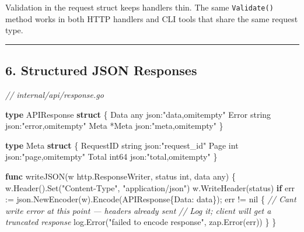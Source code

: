 \documentclass[
]{article}
\newenvironment{Shaded}{}{}
\newcommand{\CommentTok}[1]{\textcolor[rgb]{0.38,0.63,0.69}{\textit{#1}}}
\newcommand{\ControlFlowTok}[1]{\textcolor[rgb]{0.00,0.44,0.13}{\textbf{#1}}}
\newcommand{\DataTypeTok}[1]{\textcolor[rgb]{0.56,0.13,0.00}{#1}}
\newcommand{\KeywordTok}[1]{\textcolor[rgb]{0.00,0.44,0.13}{\textbf{#1}}}
\newcommand{\NormalTok}[1]{#1}
\newcommand{\OperatorTok}[1]{\textcolor[rgb]{0.40,0.40,0.40}{#1}}
\newcommand{\OtherTok}[1]{\textcolor[rgb]{0.00,0.44,0.13}{#1}}
\newcommand{\StringTok}[1]{\textcolor[rgb]{0.25,0.44,0.63}{#1}}
\begin{document}
Validation in the request struct keeps handlers thin. The same
\texttt{Validate()} method works in both HTTP handlers and CLI tools
that share the same request type.

\begin{center}\rule{0.5\linewidth}{0.5pt}\end{center}

\hypertarget{structured-json-responses}{%
\subsection{6. Structured JSON
Responses}\label{structured-json-responses}}

\begin{Shaded}
\begin{Highlighting}[]
\CommentTok{// internal/api/response.go}

\KeywordTok{type}\NormalTok{ APIResponse }\KeywordTok{struct} \OperatorTok{\{}
\NormalTok{    Data  any    }\StringTok{\textasciigrave{}json:"data,omitempty"\textasciigrave{}}
\NormalTok{    Error }\DataTypeTok{string} \StringTok{\textasciigrave{}json:"error,omitempty"\textasciigrave{}}
\NormalTok{    Meta  }\OperatorTok{*}\NormalTok{Meta  }\StringTok{\textasciigrave{}json:"meta,omitempty"\textasciigrave{}}
\OperatorTok{\}}

\KeywordTok{type}\NormalTok{ Meta }\KeywordTok{struct} \OperatorTok{\{}
\NormalTok{    RequestID }\DataTypeTok{string} \StringTok{\textasciigrave{}json:"request\_id"\textasciigrave{}}
\NormalTok{    Page      }\DataTypeTok{int}    \StringTok{\textasciigrave{}json:"page,omitempty"\textasciigrave{}}
\NormalTok{    Total     }\DataTypeTok{int64}  \StringTok{\textasciigrave{}json:"total,omitempty"\textasciigrave{}}
\OperatorTok{\}}

\KeywordTok{func}\NormalTok{ writeJSON}\OperatorTok{(}\NormalTok{w http}\OperatorTok{.}\NormalTok{ResponseWriter}\OperatorTok{,}\NormalTok{ status }\DataTypeTok{int}\OperatorTok{,}\NormalTok{ data any}\OperatorTok{)} \OperatorTok{\{}
\NormalTok{    w}\OperatorTok{.}\NormalTok{Header}\OperatorTok{().}\NormalTok{Set}\OperatorTok{(}\StringTok{"Content{-}Type"}\OperatorTok{,} \StringTok{"application/json"}\OperatorTok{)}
\NormalTok{    w}\OperatorTok{.}\NormalTok{WriteHeader}\OperatorTok{(}\NormalTok{status}\OperatorTok{)}
    \ControlFlowTok{if}\NormalTok{ err }\OperatorTok{:=}\NormalTok{ json}\OperatorTok{.}\NormalTok{NewEncoder}\OperatorTok{(}\NormalTok{w}\OperatorTok{).}\NormalTok{Encode}\OperatorTok{(}\NormalTok{APIResponse}\OperatorTok{\{}\NormalTok{Data}\OperatorTok{:}\NormalTok{ data}\OperatorTok{\});}\NormalTok{ err }\OperatorTok{!=} \OtherTok{nil} \OperatorTok{\{}
        \CommentTok{// Can\textquotesingle{}t write error at this point — headers already sent}
        \CommentTok{// Log it; client will get a truncated response}
\NormalTok{        log}\OperatorTok{.}\NormalTok{Error}\OperatorTok{(}\StringTok{"failed to encode response"}\OperatorTok{,}\NormalTok{ zap}\OperatorTok{.}\NormalTok{Error}\OperatorTok{(}\NormalTok{err}\OperatorTok{))}
    \OperatorTok{\}}
\OperatorTok{\}}


\end{Highlighting}
\end{Shaded}
\end{document}
